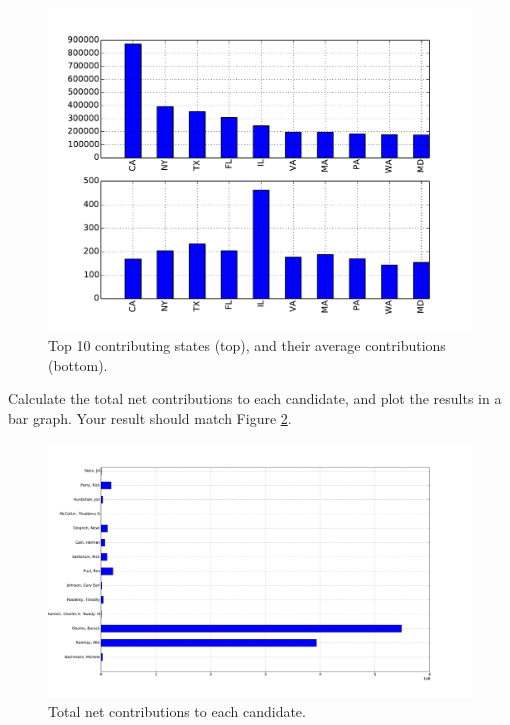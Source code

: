 \begin{figure}
\centering
\includegraphics[width=\textwidth]{states.pdf}
\caption{Top 10 contributing states (top), and their average contributions (bottom).}
\label{pandas:states}
\end{figure}

\begin{problem}
Calculate the total net contributions to each candidate, and plot the results in a bar graph.
Your result should match Figure \ref{pandas:cand_contb}.
\end{problem}

\begin{figure}
\centering
\includegraphics[width=\textwidth]{cand_contb.pdf}
\caption{Total net contributions to each candidate.}
\label{pandas:cand_contb}
\end{figure}


